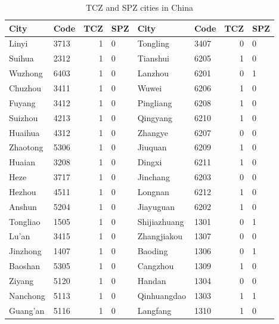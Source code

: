 \documentclass[12pt]{article}
\begin{document}
\begin{table}[!htb] \centering
  \caption{TCZ and SPZ cities in China}
  \begin{adjustbox}{width=\textwidth, totalheight=\baselineskip,keepaspectratio}
    \label{tab:appendix1}
\begin{tabular}{llrlllrl}
\hline
        City &  Code &  TCZ & SPZ &          City &  Code &  TCZ & SPZ \\
\midrule
       Linyi &  3713 &    1 &   0 &      Tongling &  3407 &    0 &   0 \\
      Suihua &  2312 &    1 &   0 &      Tianshui &  6205 &    1 &   0 \\
     Wuzhong &  6403 &    1 &   0 &       Lanzhou &  6201 &    0 &   1 \\
     Chuzhou &  3411 &    1 &   0 &         Wuwei &  6206 &    1 &   0 \\
      Fuyang &  3412 &    1 &   0 &     Pingliang &  6208 &    1 &   0 \\
     Suizhou &  4213 &    1 &   0 &      Qingyang &  6210 &    1 &   0 \\
     Huaihua &  4312 &    1 &   0 &       Zhangye &  6207 &    0 &   0 \\
    Zhaotong &  5306 &    1 &   0 &       Jiuquan &  6209 &    1 &   0 \\
      Huaian &  3208 &    1 &   0 &        Dingxi &  6211 &    1 &   0 \\
        Heze &  3717 &    1 &   0 &      Jinchang &  6203 &    0 &   0 \\
      Hezhou &  4511 &    1 &   0 &       Longnan &  6212 &    1 &   0 \\
      Anshun &  5204 &    1 &   0 &     Jiayuguan &  6202 &    1 &   0 \\
    Tongliao &  1505 &    1 &   0 &  Shijiazhuang &  1301 &    0 &   1 \\
       Lu'an &  3415 &    1 &   0 &   Zhangjiakou &  1307 &    0 &   0 \\
    Jinzhong &  1407 &    1 &   0 &       Baoding &  1306 &    0 &   1 \\
     Baoshan &  5305 &    1 &   0 &      Cangzhou &  1309 &    1 &   0 \\
      Ziyang &  5120 &    1 &   0 &        Handan &  1304 &    0 &   0 \\
    Nanchong &  5113 &    1 &   0 &   Qinhuangdao &  1303 &    1 &   1 \\
    Guang'an &  5116 &    1 &   0 &      Langfang &  1310 &    1 &   0 \\

\end{tabular}
\end{adjustbox}
\end{table}
\end{document}
